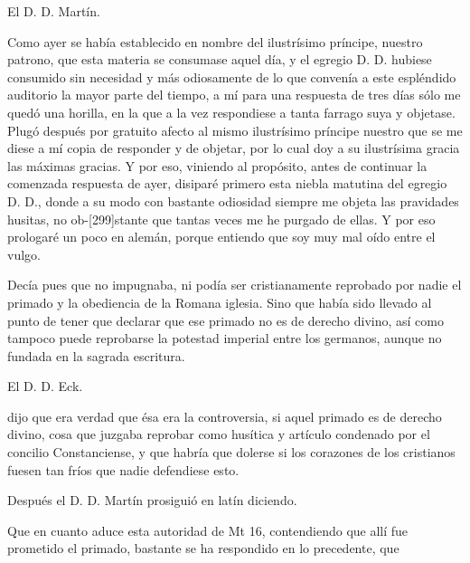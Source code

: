 El D. D. Martín.

Como ayer se había establecido en nombre del ilustrísimo príncipe, nuestro patrono, que esta materia se consumase aquel día, y el egregio D. D. hubiese consumido sin necesidad y más odiosamente de lo que convenía a este espléndido auditorio la mayor parte del tiempo, a mí para una respuesta de tres días sólo me quedó una horilla, en la que a la vez respondiese a tanta farrago suya y objetase. Plugó después por gratuito afecto al mismo ilustrísimo príncipe nuestro que se me diese a mí copia de responder y de objetar, por lo cual doy a su ilustrísima gracia las máximas gracias. Y por eso, viniendo al propósito, antes de continuar la comenzada respuesta de ayer, disiparé primero esta niebla matutina del egregio D. D., donde a su modo con bastante odiosidad siempre me objeta las pravidades husitas, no ob-[299]stante que tantas veces me he purgado de ellas. Y por eso prologaré un poco en alemán, porque entiendo que soy muy mal oído entre el vulgo.

Decía pues que no impugnaba, ni podía ser cristianamente reprobado por nadie el primado y la obediencia de la Romana iglesia. Sino que había sido llevado al punto de tener que declarar que ese primado no es de derecho divino, así como tampoco puede reprobarse la potestad imperial entre los germanos, aunque no fundada en la sagrada escritura.

El D. D. Eck.

dijo que era verdad que ésa era la controversia, si aquel primado es de derecho divino, cosa que juzgaba reprobar como husítica y artículo condenado por el concilio Constanciense, y que habría que dolerse si los corazones de los cristianos fuesen tan fríos que nadie defendiese esto.

Después el D. D. Martín prosiguió en latín diciendo.

Que en cuanto aduce esta autoridad de Mt 16, contendiendo que allí fue prometido el primado, bastante se ha respondido en lo precedente, que

